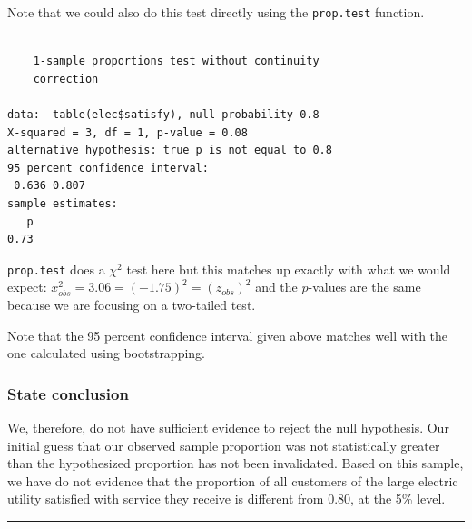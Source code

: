\documentclass[12pt, krantz2,]{krantz}
\makeatletter
\newenvironment{Shaded}{\begin{snugshade}}{\end{snugshade}}
\newcommand{\DataTypeTok}[1]{\textcolor[rgb]{0.27,0.27,0.27}{#1}}
\newcommand{\FloatTok}[1]{\textcolor[rgb]{0.06,0.06,0.06}{#1}}
\newcommand{\KeywordTok}[1]{\textcolor[rgb]{0.27,0.27,0.27}{\textbf{#1}}}
\newcommand{\NormalTok}[1]{#1}
\newcommand{\OperatorTok}[1]{\textcolor[rgb]{0.43,0.43,0.43}{\textbf{#1}}}
\newcommand{\OtherTok}[1]{\textcolor[rgb]{0.37,0.37,0.37}{#1}}
\newcommand{\StringTok}[1]{\textcolor[rgb]{0.5,0.5,0.5}{#1}}
\newenvironment{kframe}{%
\medskip{}
\setlength{\fboxsep}{.8em}
 \def\at@end@of@kframe{}%
 \ifinner\ifhmode%
  \def\at@end@of@kframe{\end{minipage}}%
  \begin{minipage}{\columnwidth}%
 \fi\fi%
 \def\FrameCommand##1{\hskip\@totalleftmargin \hskip-\fboxsep
 \colorbox{shadecolor}{##1}\hskip-\fboxsep
     \hskip-\linewidth \hskip-\@totalleftmargin \hskip\columnwidth}%
 \MakeFramed {\advance\hsize-\width
   \@totalleftmargin\z@ \linewidth\hsize
   \@setminipage}}%
 {\par\unskip\endMakeFramed%
 \at@end@of@kframe}
\renewenvironment{Shaded}{\begin{kframe}}{\end{kframe}}
\makeatother
\begin{document}
Note that we could also do this test directly using the \texttt{prop.test} function.

\begin{Shaded}
\end{Shaded}

\begin{verbatim}

    1-sample proportions test without continuity
    correction

data:  table(elec$satisfy), null probability 0.8
X-squared = 3, df = 1, p-value = 0.08
alternative hypothesis: true p is not equal to 0.8
95 percent confidence interval:
 0.636 0.807
sample estimates:
   p 
0.73 
\end{verbatim}

\texttt{prop.test} does a \(\chi^2\) test here but this matches up exactly with what we would expect: \(x^2_{obs} = 3.06 = (-1.75)^2 = (z_{obs})^2\) and the \(p\)-values are the same because we are focusing on a two-tailed test.

Note that the 95 percent confidence interval given above matches well with the one calculated using bootstrapping.

\hypertarget{state-conclusion-1}{%
\subsubsection*{State conclusion}\label{state-conclusion-1}}


We, therefore, do not have sufficient evidence to reject the null hypothesis. Our initial guess that our observed sample proportion was not statistically greater than the hypothesized proportion has not been invalidated. Based on this sample, we have do not evidence that the proportion of all customers of the large electric utility satisfied with service they receive is different from 0.80, at the 5\% level.

\begin{center}\rule{0.5\linewidth}{\linethickness}\end{center}
\end{document}
